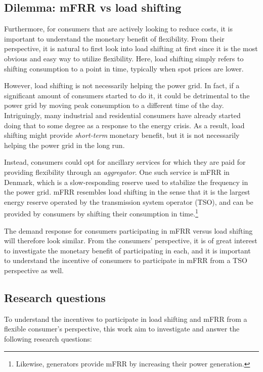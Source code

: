 \IEEEpubidadjcol


\subsection{Dilemma: mFRR vs load shifting}

Furthermore, for consumers that are actively looking to reduce costs, it is important to understand the monetary benefit of flexibility. From their perspective, it is natural to first look into load shifting at first since it is the most obvious and easy way to utilize flexibility. Here, load shifting simply refers to shifting consumption to a point in time, typically when spot prices are lower.

However, load shifting is not necessarily helping the power grid. In fact, if a significant amount of consumers started to do it, it could be detrimental to the power grid by moving peak consumption to a different time of the day. Intriguingly, many industrial and residential consumers have already started doing that to some degree as a response to the energy crisis. As a result, load shifting might provide \textit{short-term} monetary benefit, but it is not necessarily helping the power grid in the long run.

Instead, consumers could opt for ancillary services for which they are paid for providing flexibility through an \textit{aggregator}. One such service is mFRR in Denmark, which is a slow-responding reserve used to stabilize the frequency in the power grid. mFRR resembles load shifting in the sense that it is the largest energy reserve operated by the transmission system operator (TSO), and can be provided by consumers by shifting their consumption in time.\footnote{Likewise, generators provide mFRR by increasing their power generation.}

The demand response for consumers participating in mFRR versus load shifting will therefore look similar. From the consumers' perspective, it is of great interest to investigate the monetary benefit of participating in each, and it is important to understand the incentive of consumers to participate in mFRR from a TSO perspective as well.

\subsection{Research questions}

To understand the incentives to participate in load shifting and mFRR from a flexible consumer's perspective, this work aim to investigate and answer the following research questions:


